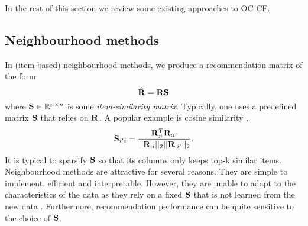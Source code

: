 In the rest of this section we review some existing approaches to OC-CF.
%
\subsection{Neighbourhood methods}
\label{sec:knn}

In (item-based) neighbourhood methods, we produce a recommendation matrix of the form
\begin{equation}
\label{eqn:knn}
\hat{\mathbf{R}} = \mathbf{R} \mathbf{S}
\end{equation}
where $\mathbf{S} \in \mathbb{R}^{n \times n}$ is some \emph{item-similarity matrix}.
Typically, one uses a predefined matrix $\mathbf{S}$ that relies on $\mathbf{R}$. A popular example is cosine similarity \citep{Sarwar:2001, Linden:2003}, 
$$ \mathbf{S}_{i' i} = \frac{ \mathbf{R}_{:i}^T \mathbf{R}_{:i'} }{|| \mathbf{R}_{:i} ||_2 || \mathbf{R}_{:i'} ||_2}. $$
It is typical to sparsify $\mathbf{S}$ so that its columns only keeps top-k similar items. 
Neighbourhood methods are attractive for several reasons.
They are simple to implement, efficient 
and interpretable.
However, they are unable to adapt to the characteristics of the data as they rely on a fixed $\mathbf{S}$ that is not learned from the new data \citep{Koren:2008b}. Furthermore, recommendation performance can be quite sensitive to the choice of $\mathbf{S}$.

